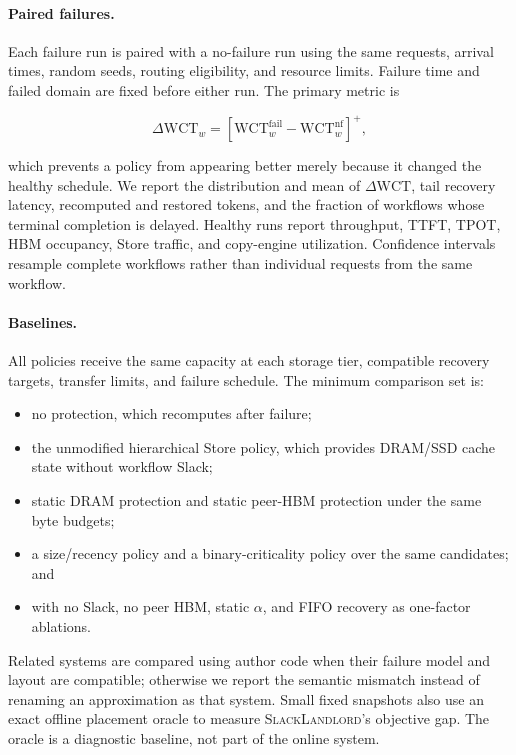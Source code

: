 \paragraph{Paired failures.}
Each failure run is paired with a no-failure run using the same requests,
arrival times, random seeds, routing eligibility, and resource limits.  Failure
time and failed domain are fixed before either run.  The primary metric is

\begin{equation}
  \Delta\mathrm{WCT}_w=
  \left[\mathrm{WCT}^{\mathrm{fail}}_w-
  \mathrm{WCT}^{\mathrm{nf}}_w\right]^+,
  \label{eq:evaluation-delta-wct}
\end{equation}

which prevents a policy from appearing better merely because it changed the
healthy schedule.  We report the distribution and mean of
$\Delta\mathrm{WCT}$, tail recovery latency, recomputed and restored tokens,
and the fraction of workflows whose terminal completion is delayed.  Healthy
runs report throughput, TTFT, TPOT, HBM occupancy, Store traffic, and copy-engine
utilization.  Confidence intervals resample complete workflows rather than
individual requests from the same workflow.

\paragraph{Baselines.}
All policies receive the same capacity at each storage tier, compatible
recovery targets, transfer limits, and failure schedule.  The minimum
comparison set is:

\begin{itemize}
  \item no protection, which recomputes after failure;
  \item the unmodified hierarchical Store policy, which provides DRAM/SSD
  cache state without workflow Slack;
  \item static DRAM protection and static peer-HBM protection under the same
  byte budgets;
  \item a size/recency policy and a binary-criticality policy over the same
  candidates; and
  \item \system{} with no Slack, no peer HBM, static $\alpha$, and FIFO recovery
  as one-factor ablations.
\end{itemize}

Related systems are compared using author code when their failure model and
layout are compatible; otherwise we report the semantic mismatch instead of
renaming an approximation as that system.  Small fixed snapshots also use an
exact offline placement oracle to measure \textsc{SlackLandlord}'s objective
gap.  The oracle is a diagnostic baseline, not part of the online system.

